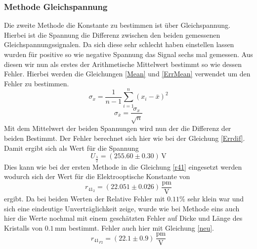 \subsubsection{Methode Gleichspannung}
Die zweite Methode die Konstante zu bestimmen ist über Gleichspannung. Hierbei ist die Spannung die Differenz zwischen den beiden gemessenen Gleichspannungssignalen. Da sich diese sehr schlecht haben einstellen lassen wurden für positive so wie negative Spannung das Signal sechs mal gemessen. Aus diesen wir nun als erstes der Arithmetische Mittelwert bestimmt so wie dessen Fehler. Hierbei werden die Gleichungen \ref{Mean} und \ref{ErrMean} verwendet um den Fehler zu bestimmen.
\begin{equation}
\sigma_x = \frac{1}{n-1}\sum_{i=1}^{n}(x_i-\bar{x})^2
\label{Mean}
\end{equation}
\begin{equation}
	\sigma_{\bar{x}}=\frac{\sigma_x}{\sqrt{n}}
	\label{ErrMean}
\end{equation}
Mit dem Mittelwert der beiden Spannungen wird nun der die Differenz der beiden Bestimmt. Der Fehler berechnet sich hier wie bei der Gleichung \ref{Errdif}.
Damit ergibt sich als Wert für die Spannung $$U_{\frac{\lambda}{2}}=(255.60\pm0.30)\,\text{V}$$ 
Dies kann wie bei der ersten Methode in die Gleichung \ref{r41}
eingesetzt werden wodurch sich der Wert für die Elektrooptische Konstante von
$$r_{41_2}=(22.051\pm 0.026)\,\frac{\text{pm}}{\text{V}}$$
ergibt. Da bei beiden Werten der Relative Fehler mit $0.11\%$ sehr klein war und sich eine eindeutige Unverträglichkeit zeige, wurde wie bei Methode eins auch hier die Werte nochmal mit einem geschätzten Fehler auf Dicke und Länge des Kristalls von $0.1$\,mm bestimmt. Fehler auch hier mit Gleichung \ref{neu}.
$$r_{41_{F2}}=(22.1\pm 0.9)\,\frac{\text{pm}}{\text{V}}$$
